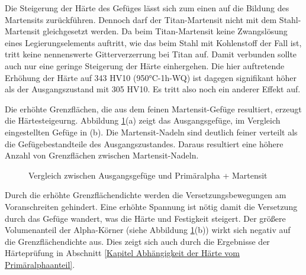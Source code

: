 \documentclass[a4paper, 11pt]{tubsreprt}
\begin{document}
Die Steigerung der Härte des Gefüges lässt sich zum einen auf die Bildung des Martensits zurückführen. Dennoch darf der Titan-Martensit nicht mit dem Stahl-Martensit gleichgesetzt werden. Da beim Titan-Martensit keine Zwangslösung eines Legierungselements auftritt, wie das beim Stahl mit Kohlenstoff der Fall ist, tritt keine nennenswerte Gitterverzerrung bei Titan auf. Damit verbunden sollte auch nur eine geringe Steigerung der Härte einhergehen. Die hier auftretende Erhöhung der Härte auf 343 HV10 (950°C-1h-WQ) ist dagegen signifikant höher als der Ausgangszustand mit 305 HV10. Es tritt also noch ein anderer Effekt auf.

Die erhöhte Grenzflächen, die aus dem feinen Martensit-Gefüge resultiert, erzeugt die Härtesteigeurng. Abbildung \ref{Vergleich Primäralpha martensit}(a) zeigt das Ausgangsgefüge, im Vergleich eingestellten Gefüge in (b). Die Martensit-Nadeln sind deutlich feiner verteilt als die Gefügebestandteile des Ausgangszustandes. Daraus resultiert eine höhere Anzahl von Grenzflächen zwischen Martensit-Nadeln.

\begin{figure}
\caption{Vergleich zwischen Ausgangsgefüge und Primäralpha + Martensit}
\label{Vergleich Primäralpha martensit}
\end{figure}


Durch die erhöhte Grenzflächendichte werden die Versetzungsbewegungen am Voranschreiten gehindert. Eine erhöhte Spannung ist nötig damit die Versetzung durch das Gefüge wandert, was die Härte und Festigkeit steigert. Der größere Volumenanteil der Alpha-Körner (siehe Abbildung \ref{Vergleich Primäralpha martensit}(b)) wirkt sich negativ auf die Grenzflächendichte aus. Dies zeigt sich auch durch die Ergebnisse der Härteprüfung in Abschnitt \ref{Kapitel Abhängigkeit der Härte vom Primäralphaanteil}. 
\end{document}
